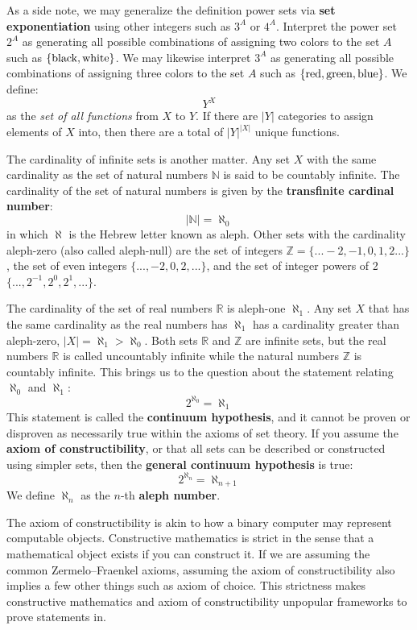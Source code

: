\documentclass[10pt, a5paper, twoside, openright]{memoir}
\begin{document}
As a side note, we may generalize the definition power sets via \textbf{set exponentiation} using other integers such as $3^A$ or $4^A$. Interpret the power set $2^A$ as generating all possible combinations of assigning two colors to the set $A$ such as $\{ \textnormal{black}, \textnormal{white} \}$. We may likewise interpret $3^A$ as generating all possible combinations of assigning three colors to the set $A$ such as $\{ \textnormal{red}, \textnormal{green}, \textnormal{blue} \}$. We define:
$$Y^X$$
as the \textit{set of all functions} from $X$ to $Y$. If there are $|Y|$ categories to assign elements of $X$ into, then there are a total of $|Y|^{|X|}$ unique functions.

The cardinality of infinite sets is another matter. Any set $X$ with the same cardinality as the set of natural numbers $\mathbb N$ is said to be countably infinite. The cardinality of the set of natural numbers is given by the \textbf{transfinite cardinal number}:
$$|\mathbb N| = \aleph_0$$
in which $\aleph$ is the Hebrew letter known as aleph. Other sets with the cardinality aleph-zero (also called aleph-null) are the set of integers $\mathbb Z = \{ ...-2,-1, 0, 1,2...\}$, the set of even integers $\{ ...,-2,0,2,...\}$, and the set of integer powers of 2 $\{ ...,2^{-1}, 2^0, 2^1,...\}$.


The cardinality of the set of real numbers $\mathbb R$ is aleph-one $\aleph_1$. Any set $X$ that has the same cardinality as the real numbers has $\aleph_1$ has a cardinality greater than aleph-zero, $|X| = \aleph_1 > \aleph_0$. Both sets $\mathbb R$ and $\mathbb Z$ are infinite sets, but the real numbers $\mathbb R$ is called uncountably infinite while the natural numbers $\mathbb Z$ is countably infinite. This brings us to the question about the statement relating $\aleph_0$ and $\aleph_1$:
$$2^{\aleph_0} = \aleph_1$$
This statement is called the \textbf{continuum hypothesis}, and it cannot be proven or disproven as necessarily true within the axioms of set theory. If you assume the \textbf{axiom of constructibility}, or that all sets can be described or constructed using simpler sets, then the \textbf{general continuum hypothesis} is true:
$$2^{\aleph_n} = \aleph_{n+1}$$
We define $\aleph_{n}$ as the $n$-th \textbf{aleph number}.

The axiom of constructibility is akin to how a binary computer may represent computable objects. Constructive mathematics is strict in the sense that a mathematical object exists if you can construct it. If we are assuming the common Zermelo–Fraenkel axioms, assuming the axiom of constructibility also implies a few other things such as axiom of choice. This strictness makes constructive mathematics and axiom of constructibility unpopular frameworks to prove statements in.
\end{document}
